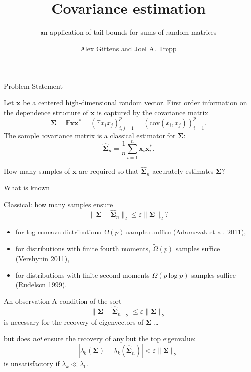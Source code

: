 \documentclass[pdf,mpa]{prosper}
\title{Covariance estimation}
\subtitle{an application of tail bounds for sums of random matrices}
\author{Alex Gittens and Joel A. Tropp}
\newcommand{\mat}[1]{\ensuremath{\mathbf{#1}}}
\renewcommand{\star}{*}
\newcommand{\E}{\ensuremath{\mathbb{E}}}
\begin{document}
\maketitle

\begin{slide}{Problem Statement}

Let $\mat{x}$ be a centered high-dimensional random vector. First order information on the dependence structure of $\mat{x}$ is captured by the covariance matrix
\[
\mat{\Sigma} = \E \mat{x} \mat{x}^\star = (\E x_i x_j)_{i,j=1}^p = (\text{cov}(x_i, x_j))_{i=1}^p.
\]
The sample covariance matrix is a classical estimator for $\mat{\Sigma}:$
\[
\widehat{\mat{\Sigma}}_n = \frac{1}{n} \sum_{i=1}^n \mat{x}_i\mat{x}_i^\star.
\]

\parbox{\textwidth}{How many samples of $\mat{x}$ are required so that $\widehat{\mat{\Sigma}}_n$ accurately estimates $\mat{\Sigma}?$}
\end{slide}

\begin{slide}{What is known}

Classical: how many samples ensure \[ \|\mat{\Sigma} - \widehat{\mat{\Sigma}}_n\|_2 \leq \varepsilon \|\mat{\Sigma}\|_2? \]
\begin{itemize}
    \item for log-concave distributions $\Omega(p)$ samples suffice (Adamczak et al. 2011), 
    \item for distributions with finite fourth moments, $\tilde{\Omega}(p)$ samples suffice (Vershynin 2011), 
    \item for distributions with finite second moments $\Omega(p\log p)$ samples suffice (Rudelson 1999). 
\end{itemize}
\end{slide}

\begin{slide}{An observation}
A condition of the sort
\[
\|\mat{\Sigma} - \widehat{\mat{\Sigma}}_n\|_2 \leq \varepsilon \|\mat{\Sigma}\|_2
\]
is necessary for the recovery of eigenvectors of $\mat{\Sigma}$ \dots

but does \emph{not} ensure the recovery of any but the top eigenvalue:
\[
|\lambda_k(\mat{\Sigma}) - \lambda_k(\widehat{\mat{\Sigma}}_n)| < \varepsilon \|\mat{\Sigma}\|_2 
\]
is unsatisfactory if $\lambda_k \ll \lambda_1.$

\end{slide}
\end{document}
